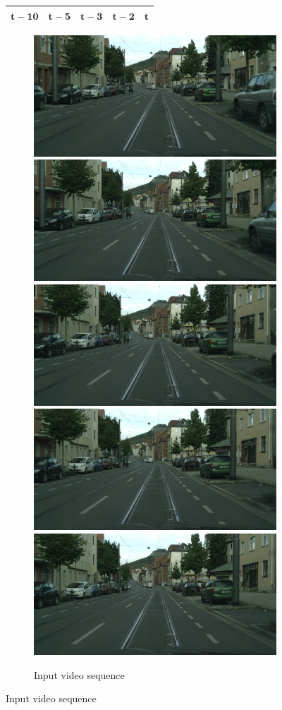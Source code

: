 \begin{figure}[t]
\begin{tabularx}{\textwidth}{@{}YYYYY@{}}
\hline
$\mathbf{t-10}$ & $\mathbf{t-5}$ & $\mathbf{t-3}$ & $\mathbf{t-2}$ & $\mathbf{t}$ \\
\hline
\end{tabularx}

\begin{subfigure}[t]{\linewidth}
\begin{center}
\includegraphics[width=0.19\linewidth]{seq/image_000086_000001_image.png}
\includegraphics[width=0.19\linewidth]{seq/image_000086_000004_image.png}
\includegraphics[width=0.19\linewidth]{seq/image_000086_000007_image.png}
\includegraphics[width=0.19\linewidth]{seq/image_000086_000008_image.png}
\includegraphics[width=0.19\linewidth]{seq/image_000086_000009_image.png}
\vspace{-2mm}
  \caption{Input video sequence}
\end{center}
\end{subfigure}



\end{figure}
